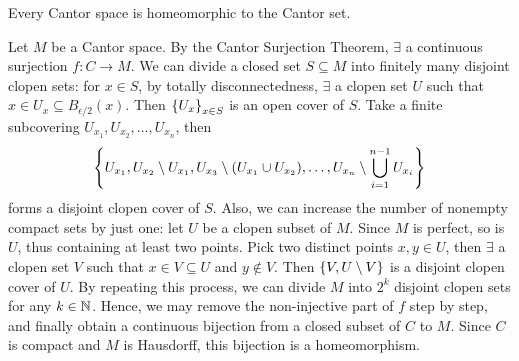 \begin{thm}
    Every Cantor space is homeomorphic to the Cantor set.
    \begin{pf}
        Let $M$ be a Cantor space. By the Cantor Surjection Theorem, $\exists$ a continuous surjection $f: C \to M$. We can divide a closed set $S \subseteq M$ into finitely many disjoint clopen sets: for $x \in S$, by totally disconnectedness, $\exists$ a clopen set $U$ such that $x \in U_x \subseteq B_{\epsilon/2}(x)$. Then ${\left\{{U_x}\right\}}_{x \in S}$ is an open cover of $S$. Take a finite subcovering $U_{x_1}, U_{x_2}, \ldots, U_{x_n}$, then
        \[
        {\left\{{U_{x_1}, U_{x_2} \setminus U_{x_1}, U_{x_3} \setminus (U_{x_1} \cup U_{x_2}), \ldots, U_{x_n} \setminus \bigcup_{i=1}^{n-1} U_{x_i}}\right\}}
        \]
        forms a disjoint clopen cover of $S$. Also, we can increase the number of nonempty compact sets by just one: let $U$ be a clopen subset of $M$. Since $M$ is perfect, so is $U$, thus containing at least two points. Pick two distinct points $x, y \in U$, then $\exists$ a clopen set $V$ such that $x \in V \subseteq U$ and $y \notin V$. Then ${\left\{{V, U \setminus V}\right\}}$ is a disjoint clopen cover of $U$. By repeating this process, we can divide $M$ into $2^k$ disjoint clopen sets for any $k \in {\mathbb N}$. Hence, we may remove the non-injective part of $f$ step by step, and finally obtain a continuous bijection from a closed subset of $C$ to $M$. Since $C$ is compact and $M$ is Hausdorff, this bijection is a homeomorphism.
    \end{pf}
\end{thm}